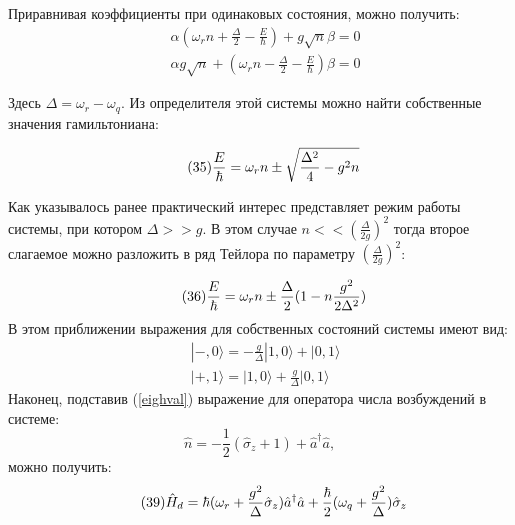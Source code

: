 Приравнивая коэффициенты при одинаковых состояния, можно получить:
\begin{equation}
\tag{34}
\begin{split}
&\alpha (\omega_r n +\frac{\Delta}{2}-\frac{E}{\hbar})+g\sqrt n \beta = 0\\
&\alpha g\sqrt n + (\omega_r n - \frac{\Delta}{2} - \frac{E}{\hbar})\beta  = 0 
\end{split}
\end{equation}

Здесь $\Delta = \omega_r - \omega_q$. Из определителя этой системы можно найти собственные значения гамильтониана:

\begin{equation}
\tag{35}
\frac{E}{\hbar}=\omega_r n \pm \sqrt{\frac{\Delta^2}{4}-g^2 n}
\\
\end{equation}

Как указывалось ранее практический интерес представляет режим работы системы, при котором $\Delta >>g$. В этом случае $n<<(\frac{\Delta}{2g})^2$ тогда второе слагаемое можно разложить в ряд Тейлора по параметру $(\frac{\Delta}{2g})^2$:

\begin{equation}
\tag{36}
\label{eighval}
\frac{E}{\hbar} = \omega_r n \pm \frac{\Delta}{2}(1- n \frac{g^2}{2\Delta^2})
\\
\end{equation}
В этом приближении выражения для собственных состояний системы имеют вид:
\begin{equation}
\tag{37}
\begin{split}
&|-,0\rangle = -\frac{g}{\Delta}|1,0\rangle + |0,1\rangle\\
&|+,1\rangle = |1,0\rangle + \frac{g}{\Delta}|0,1\rangle
\end{split}
\end{equation}
Наконец, подставив (\ref{eighval}) выражение для оператора числа возбуждений в системе:
\begin{equation}
\tag{38}
\hat n = -\frac{1}{2}(\hat \sigma_z +1)+\hat a^\dagger\hat a,
\end{equation}
\noindent можно получить:
\begin{equation}
\label{JChamD}
\tag{39}
\hat H_d = \hbar(\omega_r + \frac{g^2}{\Delta}\hat\sigma_z)\hat a ^\dagger\hat a + \frac{\hbar}{2}(\omega_q +\frac{g^2}{\Delta})\hat\sigma_z
\\
\end{equation}

